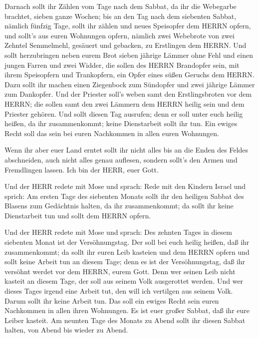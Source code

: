  Darnach sollt ihr Zählen vom Tage nach dem Sabbat, da ihr
die Webegarbe brachtet, sieben ganze Wochen;  bis an den
Tag nach dem siebenten Sabbat, nämlich fünfzig Tage, sollt ihr zählen
und neues Speisopfer dem HERRN opfern,  und sollt's aus
euren Wohnungen opfern, nämlich zwei Webebrote von zwei Zehntel
Semmelmehl, gesäuert und gebacken, zu Erstlingen dem HERRN.
 Und sollt herzubringen neben eurem Brot sieben jährige
Lämmer ohne Fehl und einen jungen Farren und zwei Widder, die sollen des
HERRN Brandopfer sein, mit ihrem Speisopfern und Trankopfern, ein Opfer
eines süßen Geruchs dem HERRN.  Dazu sollt ihr machen einen
Ziegenbock zum Sündopfer und zwei jährige Lämmer zum Dankopfer.
 Und der Priester soll's weben samt den Erstlingsbroten vor
dem HERRN; die sollen samt den zwei Lämmern dem HERRN heilig sein und
dem Priester gehören.  Und sollt diesen Tag ausrufen; denn
er soll unter euch heilig heißen, da ihr zusammenkommt; keine
Dienstarbeit sollt ihr tun. Ein ewiges Recht soll das sein bei euren
Nachkommen in allen euren Wohnungen.

 Wenn ihr aber euer Land erntet sollt ihr nicht alles bis
an die Enden des Feldes abschneiden, auch nicht alles genau auflesen,
sondern sollt's den Armen und Fremdlingen lassen. Ich bin der HERR, euer
Gott.

 Und der HERR redete mit Mose und sprach: 
Rede mit den Kindern Israel und sprich: Am ersten Tage des siebenten
Monats sollt ihr den heiligen Sabbat des Blasens zum Gedächtnis halten,
da ihr zusammenkommt;  da sollt ihr keine Dienstarbeit tun
und sollt dem HERRN opfern.

 Und der HERR redete mit Mose und sprach:  Des
zehnten Tages in diesem siebenten Monat ist der Versöhnungstag. Der soll
bei euch heilig heißen, daß ihr zusammenkommt; da sollt ihr euren Leib
kasteien und dem HERRN opfern  und sollt keine Arbeit tun
an diesem Tage; denn es ist der Versöhnungstag, daß ihr versöhnt werdet
vor dem HERRN, eurem Gott.  Denn wer seinen Leib nicht
kasteit an diesem Tage, der soll aus seinem Volk ausgerottet werden.
 Und wer dieses Tages irgend eine Arbeit tut, den will ich
vertilgen aus seinem Volk.  Darum sollt ihr keine Arbeit
tun. Das soll ein ewiges Recht sein euren Nachkommen in allen ihren
Wohnungen.  Es ist euer großer Sabbat, daß ihr eure Leiber
kasteit. Am neunten Tage des Monats zu Abend sollt ihr diesen Sabbat
halten, von Abend bis wieder zu Abend.


